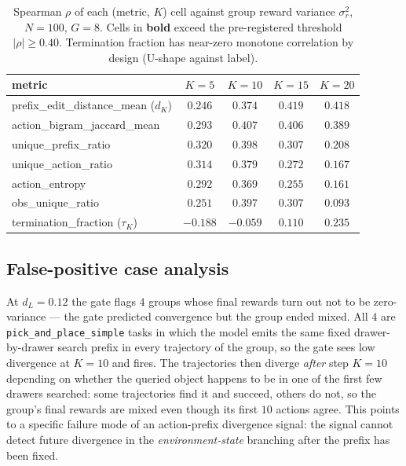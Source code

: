 \documentclass{article}
\begin{document}
\begin{table}[h]
\centering
\caption{Spearman $\rho$ of each (metric, $K$) cell against
group reward variance $\sigma_r^2$, $N\!=\!100$, $G\!=\!8$. Cells in
\textbf{bold} exceed the pre-registered threshold
$|\rho|\!\ge\!0.40$. Termination fraction has near-zero monotone
correlation by design (U-shape against label).}
\label{tab:full_corr}
\small
\begin{tabular}{lcccc}
\toprule
metric & $K\!=\!5$ & $K\!=\!10$ & $K\!=\!15$ & $K\!=\!20$ \\
\midrule
prefix\_edit\_distance\_mean ($d_K$) & $0.246$ & $0.374$ & $\mathbf{0.419}$ & $\mathbf{0.418}$ \\
action\_bigram\_jaccard\_mean        & $0.293$ & $\mathbf{0.407}$ & $\mathbf{0.406}$ & $0.389$ \\
unique\_prefix\_ratio                & $0.320$ & $0.398$ & $0.307$ & $0.208$ \\
unique\_action\_ratio                & $0.314$ & $0.379$ & $0.272$ & $0.167$ \\
action\_entropy                      & $0.292$ & $0.369$ & $0.255$ & $0.161$ \\
obs\_unique\_ratio                   & $0.251$ & $0.397$ & $0.307$ & $0.093$ \\
termination\_fraction ($\tau_K$)     & $-0.188$ & $-0.059$ & $0.110$ & $0.235$ \\
\bottomrule
\end{tabular}
\end{table}

\subsection{False-positive case analysis}
\label{app:fp_case}

At $d_L\!=\!0.12$ the gate flags $4$ groups whose final rewards
turn out not to be zero-variance --- the gate predicted
convergence but the group ended mixed. All $4$ are
\texttt{pick\_and\_place\_simple} tasks in which the model emits
the same fixed drawer-by-drawer search prefix in every trajectory
of the group, so the gate sees low divergence at $K\!=\!10$ and
fires. The trajectories then diverge \emph{after} step $K\!=\!10$
depending on whether the queried object happens to be in one of
the first few drawers searched: some trajectories find it and
succeed, others do not, so the group's final rewards are mixed
even though its first $10$ actions agree. This points to a
specific failure mode of an action-prefix divergence signal: the
signal cannot detect future divergence in the
\emph{environment-state} branching after the prefix has been
fixed.
\end{document}
